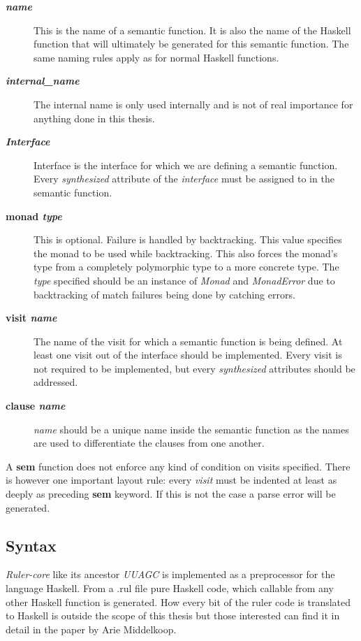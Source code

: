 \documentclass[twoside, titlepage, openright, a4paper]{book}
\newcommand{\Rcore}{\emph{Ruler-core }}
\begin{document}
\begin{description}
\item[\textbf{\textit{name}}] This is the name of a semantic function. It is also the name of the Haskell function that will ultimately be generated for this semantic function. The same naming rules apply as for normal Haskell functions.
\item[\textbf{\textit{internal\_name}}] The internal name is only used internally and is not of real importance for anything done in this thesis.
\item[\textbf{\textit{Interface}}] Interface is the interface for which we are defining a semantic function. Every \emph{synthesized} attribute of the \emph{interface} must be assigned to in the semantic function.
\item[\textbf{monad \textit{type}}] { This is optional. Failure is handled by backtracking. This value specifies the monad to be used while backtracking. This also forces the monad's type from a completely polymorphic type to a more concrete type. The \textit{type} specified should be an instance of \emph{Monad} and \emph{MonadError} due to backtracking of match failures being done by catching errors.}
\item[\textbf{visit \textit{name}}] The name of the visit for which a semantic function is being defined. At least one visit out of the interface should be implemented. Every visit is not required to be implemented, but every \emph{synthesized} attributes should be addressed.
\item[\textbf{clause \textit{name}}] \textit{name} should be a unique name inside the semantic function as the names are used to differentiate the clauses from one another.
\end{description}

A \textbf{sem} function does not enforce any kind of condition on visits specified. There is however one important layout rule: every \emph{visit} must be indented at least as deeply as preceding \textbf{sem} keyword. If this is not the case a parse error will be generated.

\subsection{Syntax}
\Rcore like its ancestor \emph{UUAGC} is implemented as a preprocessor for the language Haskell. From a .rul file pure Haskell code, which callable from any other Haskell function is generated. How every bit of the ruler code is translated to Haskell is outside the scope of this thesis but those interested can find it in detail in the paper by Arie Middelkoop\cite{visitag}.
\end{document}
